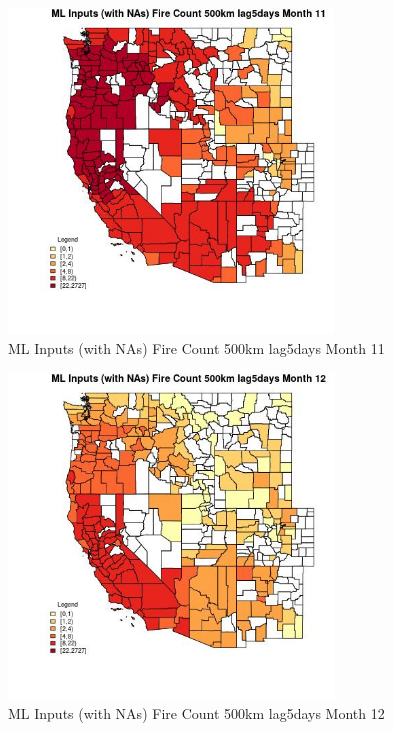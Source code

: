 \begin{figure} 
\centering  
\includegraphics[width=0.77\textwidth]{Code_Outputs/Report_ML_input_PM25_Step4_part_f_de_duplicated_aveswNAs_CountyFire_Count_500km_lag5daysmedianMonth11.jpg} 
\caption{\label{fig:Report_ML_input_PM25_Step4_part_f_de_duplicated_aveswNAsCountyFire_Count_500km_lag5daysmedianMonth11}ML Inputs (with NAs) Fire Count 500km lag5days Month 11} 
\end{figure} 
 

\begin{figure} 
\centering  
\includegraphics[width=0.77\textwidth]{Code_Outputs/Report_ML_input_PM25_Step4_part_f_de_duplicated_aveswNAs_CountyFire_Count_500km_lag5daysmedianMonth12.jpg} 
\caption{\label{fig:Report_ML_input_PM25_Step4_part_f_de_duplicated_aveswNAsCountyFire_Count_500km_lag5daysmedianMonth12}ML Inputs (with NAs) Fire Count 500km lag5days Month 12} 
\end{figure} 
 

